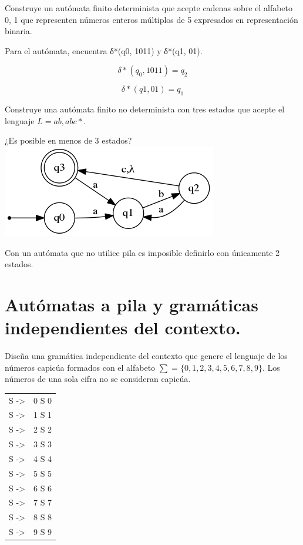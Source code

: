 \documentclass[nochap]{apuntes}
\begin{document}
\begin{problem}[4]
Construye un autómata finito determinista que acepte cadenas sobre el alfabeto {0, 1} que representen números enteros múltiplos de 5 expresados en representación binaria.
\solution

\end{problem}

\begin{problem}[5]
Para el autómata, encuentra δ*(q0, 1011) y δ*(q1, 01).
\solution

$$δ*(q_0, 1011) = q_2$$

$$δ*(q1, 01) = q_1$$

\end{problem}

\begin{problem}[6]
Construye una autómata finito no determinista con tres estados que acepte el lenguaje $L = {ab, abc}*.$

¿Es posible en menos de 3 estados?
\solution
\includegraphics[scale=0.75]{data/png/1_6.png}

Con un autómata que no utilice pila es imposible definirlo con únicamente 2 estados.
\end{problem}

\section{Autómatas a pila y gramáticas independientes del contexto.}
\begin{problem}[1]
Diseña una gramática independiente del contexto que genere el lenguaje de los números capicúa formados con el alfabeto $∑ = \{0, 1, 2, 3, 4, 5, 6, 7, 8, 9\}.$ Los números de una sola cifra no se consideran capicúa.

\solution

\begin{tabular}{cc}
S -> & 0 S 0 \\
S -> & 1 S 1 \\
S -> & 2 S 2 \\
S -> & 3 S 3 \\
S -> & 4 S 4 \\
S -> & 5 S 5 \\
S -> & 6 S 6 \\
S -> & 7 S 7 \\
S -> & 8 S 8 \\
S -> & 9 S 9 \\
\end{tabular}

\end{problem}
\end{document}
